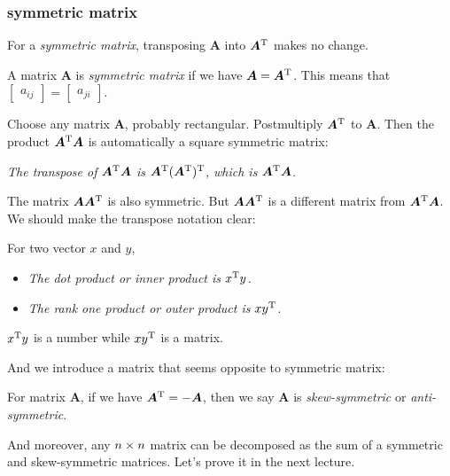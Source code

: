 \subsubsection{symmetric matrix}
For a \textit{symmetric matrix}, transposing $\bm A$ into $\bm A^{\mathrm T}$ makes no change.
\begin{definition}
A matrix $\bm A$ is \emph{symmetric matrix} if we have $\bm A = \bm A^{\mathrm T}$. This means that $\begin{bmatrix}
a_{ij}
\end{bmatrix} = \begin{bmatrix}
a_{ji}
\end{bmatrix}$.
\end{definition}
Choose any matrix $\bm A$, probably rectangular. Postmultiply $\bm A^{\mathrm T}$ to $\bm A$. Then the product $\bm A^{\mathrm T}\bm A$ is automatically a square symmetric matrix:\\
\begin{center}
\emph{The transpose of $\bm A^{\mathrm T}\bm A$ is $\bm A^{\mathrm T}(\bm A^{\mathrm T})^{\mathrm T}$, which is $\bm A^{\mathrm T}\bm A$.}
\end{center}
The matrix $\bm A\bm A^{\mathrm T}$ is also symmetric. But $\bm A\bm A^{\mathrm T}$ is a different matrix from $\bm A^{\mathrm T}\bm A$. \\
We should make the transpose notation clear:\\
\begin{remark}
For two vector $x$ and $y$,
\begin{itemize}
\item
\emph{The dot product or inner product is $x^{\mathrm T} y$.}
\item
\emph{The rank one product or outer product is $xy^{\mathrm T}$.}
\end{itemize}
$x^{\mathrm T} y$ is a number while $xy^{\mathrm T}$ is a matrix.
\end{remark}
And we introduce a matrix that seems opposite to symmetric matrix:
\begin{definition}
For matrix $\bm A$, if we have $\bm A^{\mathrm T} = -\bm A$, then we say $\bm A$ is \emph{skew-symmetric} or \emph{anti-symmetric}.
\end{definition}
And moreover, any $n\times n$ matrix can be decomposed as the sum of a symmetric and skew-symmetric matrices. Let's prove it in the next lecture.




